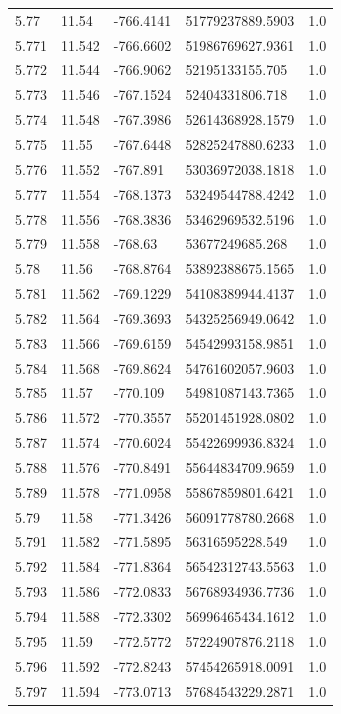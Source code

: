\begin{tabular}{lllll}
5.77 & 11.54 & -766.4141 & 51779237889.5903 & 1.0 \\
5.771 & 11.542 & -766.6602 & 51986769627.9361 & 1.0 \\
5.772 & 11.544 & -766.9062 & 52195133155.705 & 1.0 \\
5.773 & 11.546 & -767.1524 & 52404331806.718 & 1.0 \\
5.774 & 11.548 & -767.3986 & 52614368928.1579 & 1.0 \\
5.775 & 11.55 & -767.6448 & 52825247880.6233 & 1.0 \\
5.776 & 11.552 & -767.891 & 53036972038.1818 & 1.0 \\
5.777 & 11.554 & -768.1373 & 53249544788.4242 & 1.0 \\
5.778 & 11.556 & -768.3836 & 53462969532.5196 & 1.0 \\
5.779 & 11.558 & -768.63 & 53677249685.268 & 1.0 \\
5.78 & 11.56 & -768.8764 & 53892388675.1565 & 1.0 \\
5.781 & 11.562 & -769.1229 & 54108389944.4137 & 1.0 \\
5.782 & 11.564 & -769.3693 & 54325256949.0642 & 1.0 \\
5.783 & 11.566 & -769.6159 & 54542993158.9851 & 1.0 \\
5.784 & 11.568 & -769.8624 & 54761602057.9603 & 1.0 \\
5.785 & 11.57 & -770.109 & 54981087143.7365 & 1.0 \\
5.786 & 11.572 & -770.3557 & 55201451928.0802 & 1.0 \\
5.787 & 11.574 & -770.6024 & 55422699936.8324 & 1.0 \\
5.788 & 11.576 & -770.8491 & 55644834709.9659 & 1.0 \\
5.789 & 11.578 & -771.0958 & 55867859801.6421 & 1.0 \\
5.79 & 11.58 & -771.3426 & 56091778780.2668 & 1.0 \\
5.791 & 11.582 & -771.5895 & 56316595228.549 & 1.0 \\
5.792 & 11.584 & -771.8364 & 56542312743.5563 & 1.0 \\
5.793 & 11.586 & -772.0833 & 56768934936.7736 & 1.0 \\
5.794 & 11.588 & -772.3302 & 56996465434.1612 & 1.0 \\
5.795 & 11.59 & -772.5772 & 57224907876.2118 & 1.0 \\
5.796 & 11.592 & -772.8243 & 57454265918.0091 & 1.0 \\
5.797 & 11.594 & -773.0713 & 57684543229.2871 & 1.0 \\

\end{tabular}
